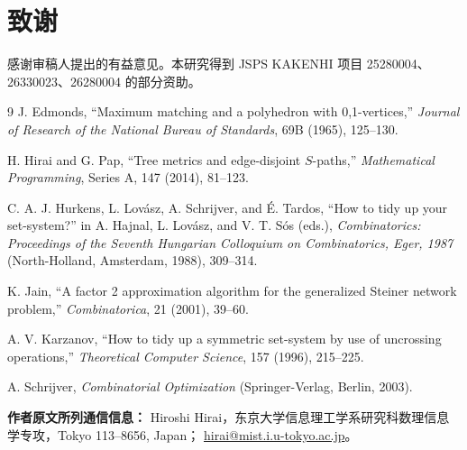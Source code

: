 \documentclass[UTF8,11pt,a4paper]{ctexart}
\numberwithin{equation}{section}
\begin{document}
\section*{致谢}

感谢审稿人提出的有益意见。本研究得到 JSPS KAKENHI 项目 25280004、26330023、26280004
的部分资助。

\begin{thebibliography}{9}
J. Edmonds, ``Maximum matching and a polyhedron with 0,1-vertices,''
\emph{Journal of Research of the National Bureau of Standards}, 69B (1965), 125--130.

H. Hirai and G. Pap, ``Tree metrics and edge-disjoint $S$-paths,''
\emph{Mathematical Programming}, Series A, 147 (2014), 81--123.

C. A. J. Hurkens, L. Lov\'asz, A. Schrijver, and \'E. Tardos,
``How to tidy up your set-system?'' in A. Hajnal, L. Lov\'asz, and V. T. S\'os (eds.),
\emph{Combinatorics: Proceedings of the Seventh Hungarian Colloquium on Combinatorics,
Eger, 1987} (North-Holland, Amsterdam, 1988), 309--314.

K. Jain, ``A factor 2 approximation algorithm for the generalized Steiner network problem,''
\emph{Combinatorica}, 21 (2001), 39--60.

A. V. Karzanov, ``How to tidy up a symmetric set-system by use of uncrossing operations,''
\emph{Theoretical Computer Science}, 157 (1996), 215--225.

A. Schrijver, \emph{Combinatorial Optimization} (Springer-Verlag, Berlin, 2003).
\end{thebibliography}

\bigskip
\noindent\textbf{作者原文所列通信信息：}\quad
Hiroshi Hirai，东京大学信息理工学系研究科数理信息学专攻，Tokyo 113--8656, Japan；
\href{mailto:hirai@mist.i.u-tokyo.ac.jp}{hirai@mist.i.u-tokyo.ac.jp}。
\end{document}
